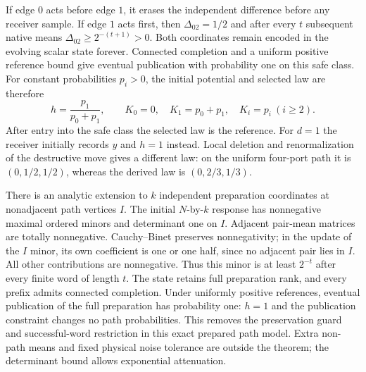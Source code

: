 If edge $0$ acts before edge $1$, it erases the independent difference
before any receiver sample. If edge $1$ acts first, then
$\Delta_{02}=1/2$ and after every $t$ subsequent native means
$\Delta_{02}\geq2^{-(t+1)}>0$. Both coordinates remain encoded in the
evolving scalar state forever. Connected completion and a uniform positive
reference bound give eventual publication with probability one on this
safe class. For constant probabilities $p_i>0$, the initial potential and
selected law are therefore
\[
 h=\frac{p_1}{p_0+p_1},\qquad K_0=0,\quad K_1=p_0+p_1,
 \quad K_i=p_i\ (i\geq2).
\]
After entry into the safe class the selected law is the reference. For
$d=1$ the receiver initially records $y$ and $h=1$ instead. Local deletion
and renormalization of the destructive move gives a different law: on
the uniform four-port path it is $(0,1/2,1/2)$, whereas the derived law is
$(0,2/3,1/3)$.

There is an analytic extension to $k$ independent preparation coordinates
at nonadjacent path vertices $I$. The initial $N$-by-$k$ response has
nonnegative maximal ordered minors and determinant one on $I$. Adjacent
pair-mean matrices are totally nonnegative. Cauchy--Binet preserves
nonnegativity; in the update of the $I$ minor, its own coefficient is one
or one half, since no adjacent pair lies in $I$. All other contributions
are nonnegative. Thus this minor is at least $2^{-t}$ after every finite
word of length $t$. The state retains full preparation rank, and every
prefix admits connected completion. Under uniformly positive references,
eventual publication of the full preparation has probability one:
$h=1$ and the publication constraint changes no path probabilities.
This removes the preservation guard and successful-word restriction in
this exact prepared path model. Extra non-path means and fixed physical
noise tolerance are outside the theorem; the determinant bound allows
exponential attenuation.

